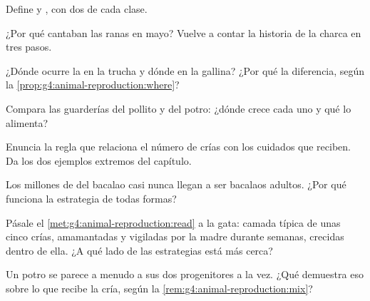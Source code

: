 \begin{exercise}[$\star$]\label{exo:g4:animal-reproduction:2}
Define  y , con dos  de cada clase.
\end{exercise}

\begin{exercise}[$\star$]\label{exo:g4:animal-reproduction:3}
¿Por qué cantaban las ranas en mayo? Vuelve a contar la historia de la
charca en tres pasos.
\end{exercise}

\begin{exercise}[$\star$]\label{exo:g4:animal-reproduction:4}
¿Dónde ocurre la  en la trucha y dónde en la gallina? ¿Por
qué la diferencia, según la \cref{prop:g4:animal-reproduction:where}?
\end{exercise}

\begin{exercise}[$\star$]\label{exo:g4:animal-reproduction:5}
Compara las guarderías del pollito y del potro: ¿dónde crece cada uno
y qué lo alimenta?
\end{exercise}

\begin{exercise}[$\star$]\label{exo:g4:animal-reproduction:6}
Enuncia la regla que relaciona el número de crías con los cuidados que
reciben. Da los dos ejemplos extremos del capítulo.
\end{exercise}

\begin{exercise}[$\star$]\label{exo:g4:animal-reproduction:7}
Los millones de  del bacalao casi nunca llegan a ser bacalaos
adultos. ¿Por qué funciona la estrategia de todas formas?
\end{exercise}

\begin{exercise}[$\star$]\label{exo:g4:animal-reproduction:8}
Pásale el \cref{met:g4:animal-reproduction:read} a la gata: camada
típica de unas cinco crías, amamantadas y vigiladas por la madre
durante semanas, crecidas dentro de ella. ¿A qué lado de las
estrategias está más cerca?
\end{exercise}

\begin{exercise}[$\star\star$]\label{exo:g4:animal-reproduction:9}
Un potro se parece a menudo a sus dos progenitores a la vez. ¿Qué
demuestra eso sobre lo que recibe la cría, según la
\cref{rem:g4:animal-reproduction:mix}?
\end{exercise}

